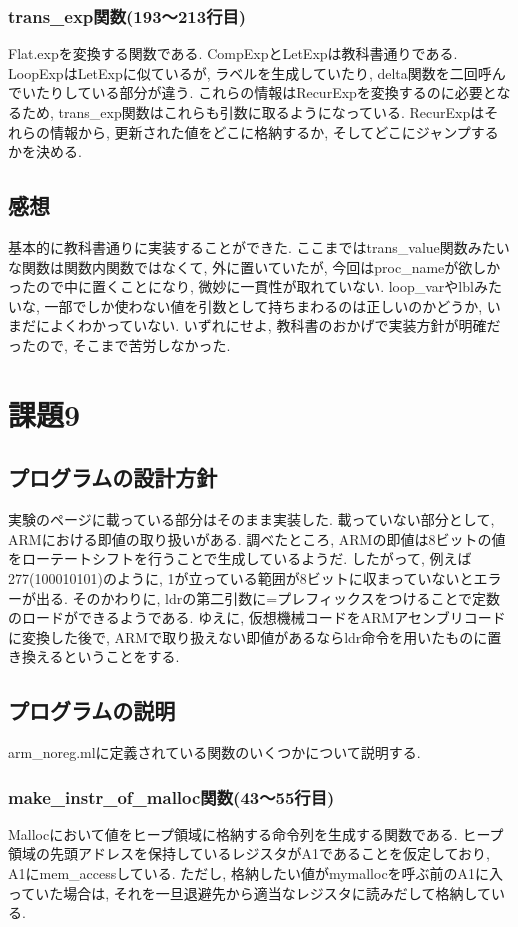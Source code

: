 \documentclass{jarticle}
\begin{document}
\subsubsection{trans\_exp関数(193～213行目)}
Flat.expを変換する関数である. CompExpとLetExpは教科書通りである. LoopExpはLetExpに似ているが, ラベルを生成していたり, delta関数を二回呼んでいたりしている部分が違う. これらの情報はRecurExpを変換するのに必要となるため, trans\_exp関数はこれらも引数に取るようになっている. RecurExpはそれらの情報から, 更新された値をどこに格納するか, そしてどこにジャンプするかを決める.
\subsection{感想}
基本的に教科書通りに実装することができた. ここまではtrans\_value関数みたいな関数は関数内関数ではなくて, 外に置いていたが, 今回はproc\_nameが欲しかったので中に置くことになり, 微妙に一貫性が取れていない. loop\_varやlblみたいな, 一部でしか使わない値を引数として持ちまわるのは正しいのかどうか, いまだによくわかっていない. いずれにせよ, 教科書のおかげで実装方針が明確だったので, そこまで苦労しなかった.


\section{課題9}
\subsection{プログラムの設計方針}
実験のページに載っている部分はそのまま実装した. 載っていない部分として, ARMにおける即値の取り扱いがある. 調べたところ, ARMの即値は8ビットの値をローテートシフトを行うことで生成しているようだ. したがって, 例えば277(100010101)のように, 1が立っている範囲が8ビットに収まっていないとエラーが出る. そのかわりに, ldrの第二引数に=プレフィックスをつけることで定数のロードができるようである. ゆえに, 仮想機械コードをARMアセンブリコードに変換した後で, ARMで取り扱えない即値があるならldr命令を用いたものに置き換えるということをする.
\subsection{プログラムの説明}
arm\_noreg.mlに定義されている関数のいくつかについて説明する.
\subsubsection{make\_instr\_of\_malloc関数(43～55行目)}
Mallocにおいて値をヒープ領域に格納する命令列を生成する関数である. ヒープ領域の先頭アドレスを保持しているレジスタがA1であることを仮定しており, A1にmem\_accessしている. ただし, 格納したい値がmymallocを呼ぶ前のA1に入っていた場合は, それを一旦退避先から適当なレジスタに読みだして格納している.
\end{document}
